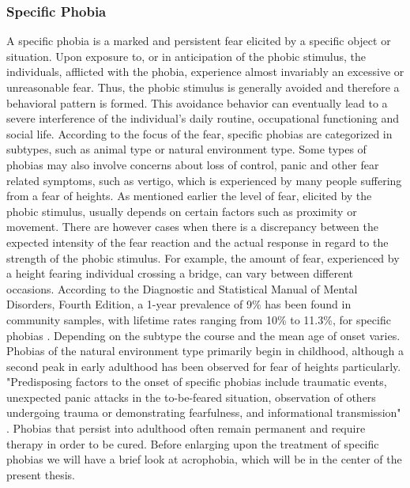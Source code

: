 \subsubsection{Specific Phobia}
A specific phobia is a marked and persistent fear elicited by a specific object or situation. Upon exposure to, or in anticipation of the phobic stimulus, the individuals, afflicted with the phobia, experience almost invariably an excessive or unreasonable fear. Thus, the phobic stimulus is generally avoided and therefore a behavioral pattern is formed. This avoidance behavior can eventually lead to a severe interference of the individual's daily routine, occupational functioning and social life. According to the focus of the fear, specific phobias are categorized in subtypes, such as animal type or natural environment type. Some types of phobias may also involve concerns about loss of control, panic and other fear related symptoms, such as vertigo, which is experienced by many people suffering from a fear of heights. As mentioned earlier the level of fear, elicited by the phobic stimulus, usually depends on certain factors such as proximity or movement. There are however cases when there is a discrepancy between the expected intensity of the fear reaction and the actual response in regard to the strength of the phobic stimulus. For example, the amount of fear, experienced by a height fearing individual crossing a bridge, can vary between different occasions. According to the Diagnostic and Statistical Manual of Mental Disorders, Fourth Edition, a 1-year prevalence of 9\% has been found in community samples, with lifetime rates ranging from 10\% to 11.3\%, for specific phobias \cite{DSMIV1994}. Depending on the subtype the course and the mean age of onset varies. Phobias of the natural environment type primarily begin in childhood, although a second peak in early adulthood has been observed for fear of heights particularly. "Predisposing factors to the onset of specific phobias include traumatic events, unexpected panic attacks in the to-be-feared situation, observation of others undergoing trauma or demonstrating fearfulness, and informational transmission" \cite{DSMIV1994}. Phobias that persist into adulthood often remain permanent and require therapy in order to be cured. Before enlarging upon the treatment of specific phobias we will have a brief look at acrophobia, which will be in the center of the present thesis.

